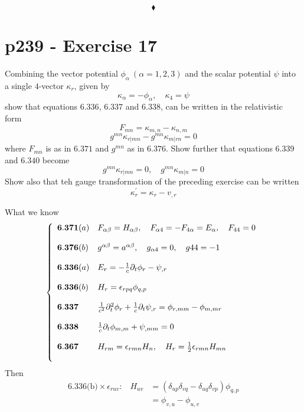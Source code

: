 $$\blacklozenge$$
\newpage


\section{p239 - Exercise 17}
\begin{tcolorbox}
Combining the vector potential $\phi_{\alpha} \ (\alpha=1,2,3)$ and the scalar potential $\psi$ into a single $4$-vector $\kappa_r$, given by
$$\kappa_{\alpha} = -\phi_{\alpha}, \quad \kappa_4= \psi$$
show that equations $\mathbf{6.336}$, $\mathbf{6.337}$ and $\mathbf{6.338}$, can be written in the relativistic form
$$F_{mn}= \kappa_{m,n}-\kappa_{n,m}$$
$$g^{mn}\kappa_{r|mn} - g^{mn}\kappa_{m|rn}=0$$
where $F_{mn}$ is as in $\mathbf{6.371}$ and $g^{mn}$ as in $\mathbf{6.376}$. Show further that equations $\mathbf{6.339}$ and $\mathbf{6.340}$ become
$$g^{mn}\kappa_{r|mn}=0,\quad g^{mn}\kappa_{m|n}=0$$ 
Show also that teh gauge transformation of the preceding exercise can be written 
$$\kappa^{'}_r = \kappa_r - v_{,r}$$
\end{tcolorbox}
What we know
\begin{align}
\left\{\begin{array}{ll}
\mathbf{6.371}(a)&F_{\alpha\beta}=H_{\alpha\beta}, \quad F_{\alpha 4}=-F_{4\alpha}=E_{\alpha}, \quad F_{44}=0  \\\\
\mathbf{6.376}(b)&g^{\alpha\beta}=a^{\alpha\beta}, \quad g_{\alpha 4}=0, \quad g{44}=-1  \\\\
\mathbf{6.336}(a)&E_r= -\frac{1}{c}\partial_t \phi_r-\psi_{,r}\\\\
\mathbf{6.336}(b)&H_r= \epsilon_{rpq} \phi_{q,p}\\\\
\mathbf{6.337}&\frac{1}{c^2}\partial^2_t \phi_r+\frac{1}{c}\partial_t\psi_{,r} = \phi_{r,mm}-\phi_{m,mr}\\\\
\mathbf{6.338}&\frac{1}{c}\partial_t \phi_{m,m}+\psi_{,mm}=0\\\\
\mathbf{6.367}&H_{rm} =\epsilon_{rmn}H_n,\quad H_r =\frac{1}{2} \epsilon_{rmn}H_{mn}\\\\
\end{array}\right.
\end{align}
Then
\begin{align}
\text{6.336(b)}\times \epsilon_{ruv}\text{:}\quad H_{uv} &= \left(\delta_{up}\delta_{vq}-\delta_{uq}\delta_{vp}\right)\phi_{q,p}\\
&=\phi_{v,u}-\phi_{u,v}
\end{align}
